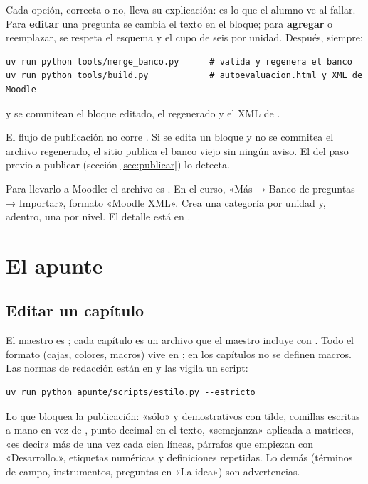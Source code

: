 \documentclass[11pt,a4paper]{report}
\newcommand{\clave}[1]{\texttt{\detokenize{#1}}}
\begin{document}
Cada opción, correcta o no, lleva su explicación: es lo que el alumno ve al fallar. Para \textbf{editar} una pregunta se cambia el texto en el bloque; para \textbf{agregar} o reemplazar, se respeta el esquema y el cupo de seis por unidad. Después, siempre:
\begin{lstlisting}[style=terminal]
uv run python tools/merge_banco.py      # valida y regenera el banco
uv run python tools/build.py            # autoevaluacion.html y XML de Moodle
\end{lstlisting}
y se commitean el bloque editado, el  regenerado y el XML de .

\begin{atencion}
El flujo de publicación no corre \clave{merge_banco.py}. Si se edita un bloque y no se commitea el archivo regenerado, el sitio publica el banco viejo sin ningún aviso. El \clave{--check} del paso previo a publicar (sección \ref{sec:publicar}) lo detecta.
\end{atencion}

Para llevarlo a Moodle: el archivo es . En el curso, «Más → Banco de preguntas → Importar», formato «Moodle XML». Crea una categoría por unidad y, adentro, una por nivel. El detalle está en .

\section{El apunte}\label{sec:apunte}

\subsection{Editar un capítulo}

El maestro es ; cada capítulo es un archivo  que el maestro incluye con \clave{}. Todo el formato (cajas, colores, macros) vive en ; en los capítulos no se definen macros. Las normas de redacción están en  y las vigila un script:
\begin{lstlisting}[style=terminal]
uv run python apunte/scripts/estilo.py --estricto
\end{lstlisting}
Lo que bloquea la publicación: «sólo» y demostrativos con tilde, comillas escritas a mano en vez de \clave{\enquote}, punto decimal en el texto, «semejanza» aplicada a matrices, «es decir» más de una vez cada cien líneas, párrafos que empiezan con «Desarrollo.», etiquetas numéricas y definiciones repetidas. Lo demás (términos de campo, instrumentos, preguntas en «La idea») son advertencias.
\end{document}
